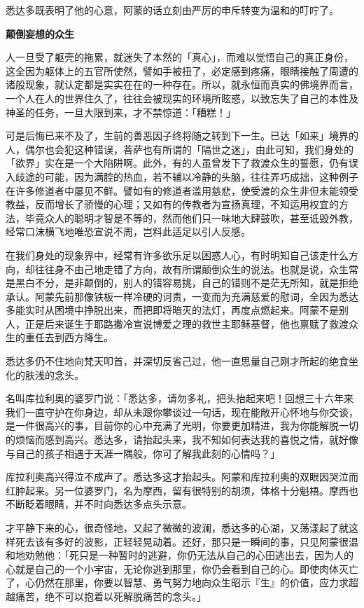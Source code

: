\documentclass[twoside,openany]{book}
\newcommand{\mt}[1]{\textbullet \textbf{#1}}
\begin{document}
悉达多既表明了他的心意，阿蒙的话立刻由严厉的申斥转变为温和的叮咛了。

\mt{颠倒妄想的众生}

人一旦受了躯壳的拖累，就迷失了本然的「真心」，而难以觉悟自己的真正身份，这全因为躯体上的五官所使然，譬如手被扭了，必定感到疼痛，眼睛接触了周遭的诸般现象，就认定都是实实在在的一种存在。所以，就永恒而真实的佛境界而言，一个人在人的世界住久了，往往会被现实的环境所眩惑，以致忘失了自己的本性及神圣的任务，一旦大限到来，才不禁惊道：「糟糕！」

可是后悔已来不及了，生前的善恶因子终将随之转到下一生。已达「如来」境界的人，偶尔也会犯这种错误，菩萨也有所谓的「隔世之迷」，由此可知，我们身处的「欲界」实在是一个大陷阱啊。此外，有的人虽曾发下了救渡众生的誓愿，仍有误入歧途的可能，因为满腔的热血，若不辅以冷静的头脑，往往弄巧成拙，这种例子在许多修道者中屡见不鲜。譬如有的修道者滥用慈悲，使受渡的众生非但未能领受教益，反而增长了骄慢的心理；又如有的传教者为宣扬真理，不知运用权宜的方法，毕竟众人的聪明才智是不等的，然而他们只一味地大肆鼓吹，甚至诋毁外教，经常口沫横飞地唯恐宣说不周，岂料此适足以引人反感。

在我们身处的现象界中，经常有许多欲乐足以困惑人心，有时明知自己该走什么方向，却往往身不由己地走错了方向，故有所谓颠倒众生的说法。也就是说，众生常是黑白不分，是非颠倒的，别人的错容易挑，自己的错则不是茫无所知，就是拒绝承认。阿蒙先前那像铁板一样冷硬的诃责，一变而为充满慈爱的慰词，全因为悉达多能实时从困境中挣脱出来，而把即将暗灭的法灯，再度点燃起来。阿蒙不是别人，正是后来诞生于耶路撒冷宣说博爱之理的救世主耶稣基督，他也禀赋了救渡众生的重任去到西方降生。

悉达多仍不住地向梵天叩首，并深切反省己过，他一直思量自己刚才所起的绝食坐化的肤浅的念头。

名叫库拉利奥的婆罗门说：「悉达多，请勿多礼，把头抬起来吧！回想三十六年来我们一直守护在你身边，却从未跟你攀谈过一句话，现在能敞开心怀地与你交谈，是一件很高兴的事，目前你的心中充满了光明，你要更加精进，我为你能解脱一切的烦恼而感到高兴。悉达多，请抬起头来，我不知如何表达我的喜悦之情，就好像与自己的孩子相遇于天涯一隅般，你可了解我此刻的心情吗？」

库拉利奥高兴得泣不成声了。悉达多这才抬起头。阿蒙和库拉利奥的双眼因哭泣而红肿起来。另一位婆罗门，名为摩西，留有很特别的胡须，体格十分魁梧。摩西也不断眨着眼睛，并不时向悉达多点头示意。

才平静下来的心，很奇怪地，又起了微微的波澜，悉达多的心湖，又荡漾起了就这样死去该有多好的波影，正轻轻晃动着。还好，那只是一瞬间的事，只见阿蒙很温和地劝勉他：「死只是一种暂时的逃避，你仍无法从自己的心田逃出去，因为人的心就是自己的一个小宇宙，无论你逃到那里，你仍会看到自己的心。即使肉体灭亡了，心仍然在那里，你要以智慧、勇气努力地向众生昭示『生』的价值，应力求超越痛苦，绝不可以抱着以死解脱痛苦的念头。」
\end{document}
